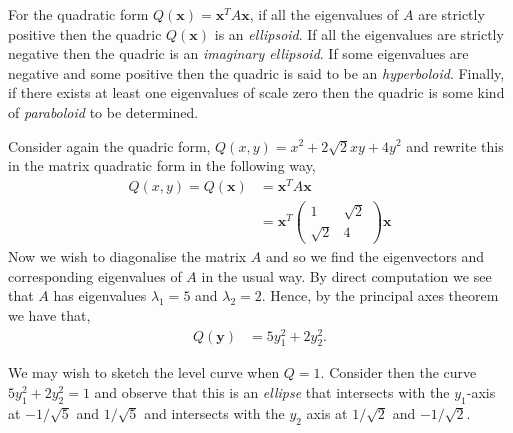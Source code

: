 \begin{lem}
 For the quadratic form $Q(\mathbf{x}) = \mathbf{x}^{T} A \mathbf{x}$, if
 all the eigenvalues of $A$ are strictly positive then the quadric $Q(\mathbf{x})$
 is an \emph{ellipsoid}. If all the eigenvalues are strictly negative then the quadric
 is an \emph{imaginary ellipsoid}. If some eigenvalues are negative and some positive
 then the quadric is said to be an \emph{hyperboloid}. Finally, if there exists at least
 one eigenvalues of scale zero then the quadric is some kind of \emph{paraboloid} to be
 determined.
\end{lem}

\begin{exmp}
 Consider again the quadric form, $Q(x,y) = x^2 + 2 \sqrt{2} xy + 4y^2$ and rewrite this
 in the matrix quadratic form in the following way,
 \begin{align*}
  Q(x,y) = Q(\mathbf{x}) &= \mathbf{x}^{T} A \mathbf{x}
  \\
  &= \mathbf{x}^{T}
  \begin{pmatrix}
   1 & \sqrt{2} \\
   \sqrt{2} & 4
  \end{pmatrix}
  \mathbf{x} \tag{division by two much like completing the square.}
  \end{align*}
  Now we wish to diagonalise the matrix $A$ and so we find the eigenvectors
  and corresponding eigenvalues of $A$ in the usual way. By direct computation
  we see that $A$ has eigenvalues $\lambda_1 = 5$ and $\lambda_2 = 2$. Hence,
  by the principal axes theorem we have that,
  \begin{align*}
   Q(\mathbf{y}) &= 5 y_1^{2} + 2 y_2^{2}.
  \end{align*}

  We may wish to sketch the level curve when $Q=1$.
  Consider then the curve $5 y_1^{2} + 2 y_2^{2} = 1$ and observe that this
  is an \emph{ellipse} that intersects with the $y_1$-axis at $-1/\sqrt{5}$
  and $1/\sqrt{5}$ and intersects with the $y_2$ axis at $1/\sqrt{2}$ and
  $-1/\sqrt{2}$.


\end{exmp}
